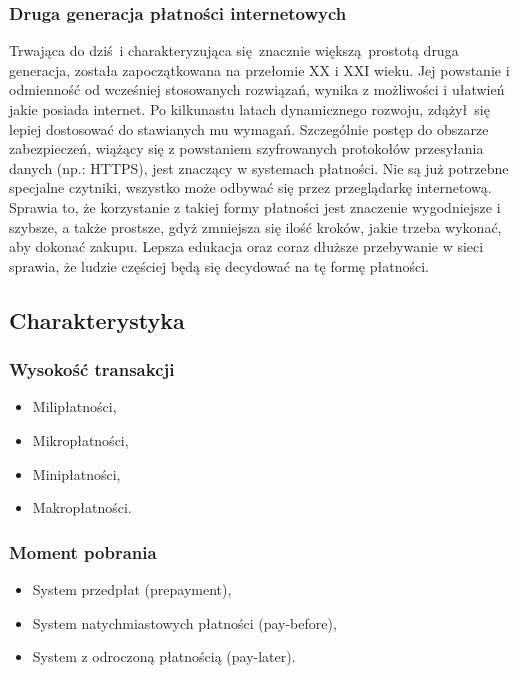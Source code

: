 \subsubsection*{Druga generacja płatności internetowych}

Trwająca do dziś i charakteryzująca się znacznie większą prostotą druga generacja, została zapoczątkowana na przełomie XX i XXI wieku. Jej powstanie i odmienność od wcześniej stosowanych rozwiązań, wynika z możliwości i ułatwień jakie posiada internet. Po kilkunastu latach dynamicznego rozwoju, zdążył się lepiej dostosować do stawianych mu wymagań. Szczególnie postęp do obszarze zabezpieczeń, wiążący się z powstaniem szyfrowanych protokołów przesyłania danych (np.: HTTPS), jest znaczący w systemach płatności. Nie są już potrzebne specjalne czytniki, wszystko może odbywać się przez przeglądarkę internetową. Sprawia to, że korzystanie z takiej formy płatności jest znaczenie wygodniejsze i szybsze, a także prostsze, gdyż zmniejsza się ilość kroków, jakie trzeba wykonać, aby dokonać zakupu. Lepsza edukacja oraz coraz dłuższe przebywanie w sieci sprawia, że ludzie częściej będą się decydować na tę formę płatności.  

\subsection{Charakterystyka}


\subsubsection*{Wysokość transakcji}
\begin{itemize}
	\item Milipłatności,
	\item Mikropłatności,
	\item Minipłatności,
	\item Makropłatności. 
\end{itemize}

\subsubsection*{Moment pobrania}
\begin{itemize}
	\item System przedpłat (prepayment),
	\item System natychmiastowych płatności (pay-before),
	\item System z odroczoną płatnością (pay-later).
\end{itemize}


